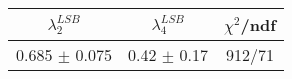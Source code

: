 \begin{tabular}{c|c||c}
$\lambda_{2}^{LSB}$ & $\lambda_4^{LSB}$ & $\chi^{2}$/ndf \\
\hline
0.685 $\pm$ 0.075 & 0.42 $\pm$ 0.17 & 912/71\\
\end{tabular}

